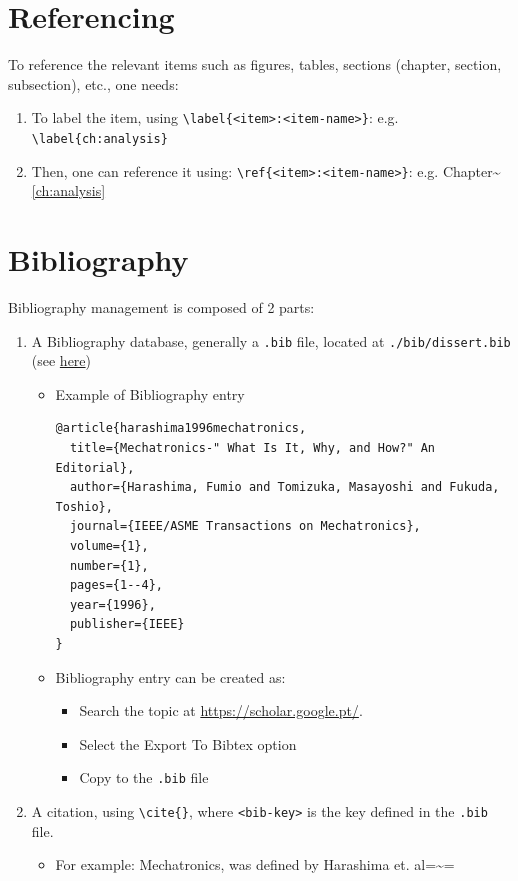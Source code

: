 \documentclass[11pt]{article}
\begin{document}
\section{Referencing}
\label{sec:org4dd53de}
To reference the relevant items such as figures, tables, sections (chapter,
section, subsection), etc., one needs:
\begin{enumerate}
\item To label the item, using \texttt{\textbackslash{}label\{<item>:<item-name>\}}:
e.g. \texttt{\textbackslash{}label\{ch:analysis\}}
\item Then, one can reference it using: \texttt{\textbackslash{}ref\{<item>:<item-name>\}}:
e.g. Chapter\textasciitilde{}\ref{ch:analysis}
\end{enumerate}
\section{Bibliography}
\label{sec:org6b2f0b5}
Bibliography management is composed of 2 parts:
\begin{enumerate}
\item A Bibliography database, generally a \texttt{.bib} file, located at
\texttt{./bib/dissert.bib} (see \href{file:///Users/zemiguel/Documents/Univ/MI\_Electro/Sem6/LPI2/PI/github/Deliverables/Final/bib/dissert.bib}{here})
\begin{itemize}
\item Example of Bibliography entry
\lstset{language=[LaTeX]TeX,label= ,caption= ,captionpos=b,numbers=none}
\begin{lstlisting}
@article{harashima1996mechatronics,
  title={Mechatronics-" What Is It, Why, and How?" An Editorial},
  author={Harashima, Fumio and Tomizuka, Masayoshi and Fukuda, Toshio},
  journal={IEEE/ASME Transactions on Mechatronics},
  volume={1},
  number={1},
  pages={1--4},
  year={1996},
  publisher={IEEE}
}
\end{lstlisting}
\item Bibliography entry can be created as:
\begin{itemize}
\item Search the topic at \url{https://scholar.google.pt/}.
\item Select the Export To Bibtex option
\item Copy to the \texttt{.bib} file
\end{itemize}
\end{itemize}
\item A citation, using \texttt{\textbackslash{}cite\{<bib-key>\}}, where \texttt{<bib-key>} is the key defined in
the \texttt{.bib} file. 
\begin{itemize}
\item For example: Mechatronics, was defined by Harashima
et. al=\textasciitilde{}\cite{harashima1996mechatronics}=
\end{itemize}
\end{enumerate}
\end{document}
